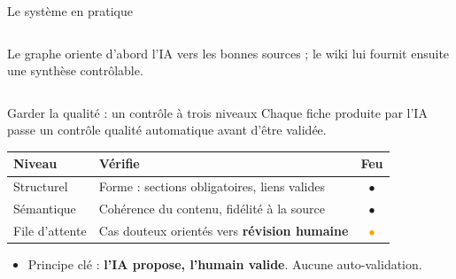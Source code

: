 \documentclass[aspectratio=169,11pt]{beamer}
\begin{document}
\begin{frame}{Le système en pratique}
\begin{columns}
{
}

{\tiny\textcolor{mygray}{Le graphe oriente d'abord l'IA vers les bonnes sources ;
le wiki lui fournit ensuite une synthèse contrôlable.}}
\end{columns}
\end{frame}

\begin{frame}{Garder la qualité : un contrôle à trois niveaux}
\small
Chaque fiche produite par l'IA passe un contrôle qualité automatique avant d'être validée.
\vspace{0.3cm}
\begin{tabularx}{\textwidth}{>{\RaggedRight\arraybackslash}p{} >{\RaggedRight\arraybackslash}X c}
\toprule
\textbf{Niveau} & \textbf{Vérifie} & \textbf{Feu} \\
\midrule
Structurel & Forme : sections obligatoires, liens valides & \textcolor{mygreen}{$\bullet$} \\
Sémantique & Cohérence du contenu, fidélité à la source & \textcolor{myred}{$\bullet$} \\
File d'attente & Cas douteux orientés vers \textbf{révision humaine} & \textcolor{orange}{$\bullet$} \\
\bottomrule
\end{tabularx}
\vspace{0.3cm}
\begin{itemize}
    \item Principe clé : \textbf{l'IA propose, l'humain valide}. Aucune auto-validation.
\end{itemize}
\end{frame}
\end{document}
